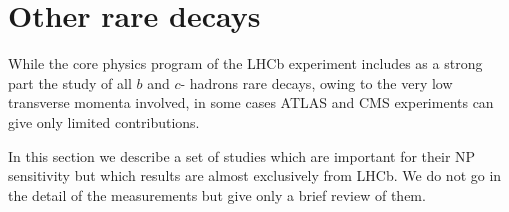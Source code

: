 \section{Other rare decays}

While the core physics program of the LHCb experiment includes as a strong part the study of all 
$b$ and $c$- hadrons rare decays, owing to the very low transverse momenta involved, in some cases
ATLAS and CMS experiments can give only limited contributions. 

In this section we describe a set of studies which are important for their NP sensitivity 
but which results are almost exclusively from LHCb. 
We do not go in the detail of the measurements but give only a brief review of them.




